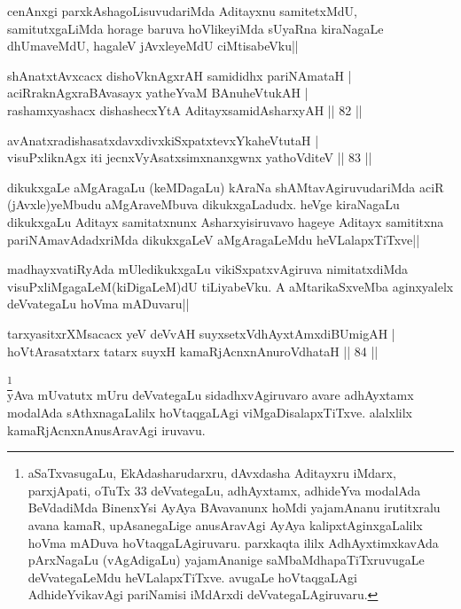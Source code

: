 \begin{artha}
cenAnxgi parxkAshagoLisuvudariMda Aditayxnu samitetxMdU, 
samitutxgaLiMda horage baruva hoVlikeyiMda sUyaRna kiraNagaLe 
dhUmaveMdU, hagaleV jAvxleyeMdU ciMtisabeVku||
\end{artha}

\begin{shl}
shAnatxtAvxcacx dishoV\s knAgxrAH samididhx pariNAmataH | \\
aciRraknAgxraBAvasayx yatheYvaM BAnuheVtukAH | \\
rashamxyashacx dishashecxYtA AditayxsamidAsharxyAH \hfill|| 82 || 
\end{shl}

\begin{shl}
avAnatxradishasatxdavxdivxkiSxpatxtevxYkaheVtutaH | \\
visuPxliknAgx iti jecnxVyAsatxsimxnanxgwnx yathoVditeV \hfill|| 83 || 
\end{shl}

\begin{artha}
dikukxgaLe aMgAragaLu (keMDagaLu) kAraNa shAMtavAgiruvudariMda aciR 
(jAvxle)yeMbudu aMgAraveMbuva dikukxgaLadudx. heVge kiraNagaLu 
dikukxgaLu Aditayx samitatxnunx Asharxyisiruvavo hageye Aditayx 
samititxna pariNAmavAdadxriMda dikukxgaLeV aMgAragaLeMdu 
heVLalapxTiTxve||
\end{artha}

\begin{artha}
madhayxvatiRyAda mUledikukxgaLu vikiSxpatxvAgiruva nimitatxdiMda 
visuPxliMgagaLeM(kiDigaLeM)dU tiLiyabeVku. A aMtarikaSxveMba 
aginxyalelx deVvategaLu hoVma mADuvaru|| 
\end{artha}


\begin{shl}
tarxyasitxrXMsacacx yeV deVvAH suyxsetxV\s dhAyxtAmxdiBUmigAH | \\
hoVtArasatxtarx tatarx suyxH kamaRjAcnxnAnuroVdhataH \hfill|| 84 || 
\end{shl}

\begin{artha}
\footnote[1]{aSaTxvasugaLu, EkAdasharudarxru, dAvxdasha Aditayxru 
iMdarx, parxjApati, oTuTx 33 deVvategaLu, adhAyxtamx, adhideYva 
modalAda BeVdadiMda BinenxYsi AyAya BAvavanunx hoMdi yajamAnanu 
irutitxralu avana kamaR, upAsanegaLige anusAravAgi AyAya 
kalipxtAginxgaLalilx hoVma mADuva hoVtaqgaLAgiruvaru. parxkaqta ililx 
AdhAyxtimxkavAda pArxNagaLu (vAgAdigaLu) yajamAnanige 
saMbaMdhapaTiTxruvugaLe deVvategaLeMdu heVLalapxTiTxve. avugaLe 
hoVtaqgaLAgi AdhideYvikavAgi pariNamisi iMdArxdi deVvategaLAgiruvaru.}\\
yAva mUvatutx mUru deVvategaLu sidadhxvAgiruvaro avare adhAyxtamx 
modalAda sAthxnagaLalilx hoVtaqgaLAgi viMgaDisalapxTiTxve. alalxlilx 
kamaRjAcnxnAnusAravAgi iruvavu.
\end{artha}

